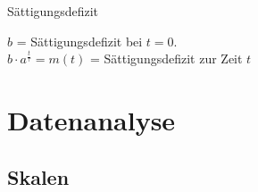 \begin{multicols}{2}

\begin{bemerkung*}{Sättigungsdefizit}{}

$b$ = Sättigungsdefizit bei $t=0$.\\
$b\cdot{}a^\frac{t}\tau = m(t)$ = Sättigungsdefizit zur Zeit $t$
\end{bemerkung*}

\end{multicols}

\hrulefill
\section*{Datenanalyse}

\subsection*{Skalen}
\vspace{5mm}


